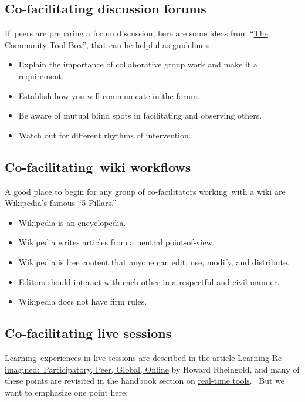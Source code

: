 \subsection{Co-facilitating discussion
forums}\label{co-facilitating-discussion-forums}

If~peers are preparing a forum discussion, here are some ideas from
``\href{http://ctb.ku.edu/en/tablecontents/section_1180.aspx}{The
Community Tool Box}'', that can be helpful as guidelines:

\begin{itemize}
\itemsep1pt\parskip0pt
\item
  Explain the importance of collaborative group work and make it a
  requirement.
\item
  Establish how you will communicate in the forum.
\item
  Be aware of mutual blind spots in facilitating and observing others.
\item
  Watch out for different rhythms of intervention.
\end{itemize}

\subsection{Co-facilitating~wiki
workflows}\label{co-facilitatingwiki-workflows}

A good place to begin for any group of co-facilitators working~with a
wiki are Wikipedia's famous ``5 Pillars.''

\begin{itemize}
\itemsep1pt\parskip0pt
\item
  Wikipedia is an encyclopedia.
\item
  Wikipedia writes articles from a neutral point-of-view.
\item
  Wikipedia is free content that anyone can edit, use, modify, and
  distribute.
\item
  Editors should interact with each other in a respectful and civil
  manner.
\item
  Wikipedia does not have firm rules.
\end{itemize}

\subsection{Co-facilitating live
sessions}\label{co-facilitating-live-sessions}

Learning~experiences in live sessions are described in the article
\href{http://dmlcentral.net/blog/howard-rheingold/learning-reimagined-participatory-peer-global-online}{Learning
Re-imagined:~Participatory, Peer, Global, Online} by Howard Rheingold,
and many of these points are revisited in the handbook section on
\href{http://peeragogy.org/real-time-meetings/}{real-time tools}.~ But
we want to emphasize one point here:

